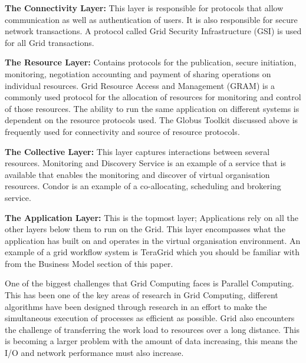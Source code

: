 \documentclass[10pt,journal,compsoc]{IEEEtran}
\begin{document}
\hspace{-0.5cm}\textbf{The Connectivity Layer:} This layer is responsible for protocols that allow communication as well as authentication of users. It is also responsible for secure network transactions. A protocol called Grid Security Infrastructure (GSI) is used for all Grid transactions. \cite{GridAndCloud} \newline

\hspace{-0.5cm}\textbf{The Resource Layer: } Contains protocols for the publication, secure initiation, monitoring, negotiation accounting and payment of sharing operations on individual resources. Grid Resource Access and Management (GRAM) is a commonly used protocol for the allocation of resources for monitoring and control of those resources. The ability to run the same application on different systems is dependent on the resource protocols used. The Globus Toolkit discussed above is frequently used for connectivity and source of resource protocols. \cite{global} \newline

\hspace{-0.5cm}\textbf{The Collective Layer:} This layer captures interactions between several resources. Monitoring and Discovery Service is an example of a service that is available that enables the monitoring and discover of virtual organisation resources. Condor is an example of a co-allocating, scheduling and brokering service.\newline

\hspace{-0.5cm}\textbf{The Application Layer:} This is the topmost layer; Applications rely on all the other layers below them to run on the Grid. This layer encompasses what the application has built on and operates in the virtual organisation environment. An example of  a grid workflow system is TeraGrid which you should be familiar with from the Business Model section of this paper.\newline \newline \newline

\hspace{-0.5cm}One of the biggest challenges that Grid Computing faces is Parallel Computing. This has been one of the key areas of research in Grid Computing, different algorithms have been designed through research in an effort to make the simultaneous execution of processes as efficient as possible. Grid also encounters the challenge of transferring the work load to resources over a long distance. This is becoming a larger problem with the amount of data increasing, this means the I/O and network performance must also increase.\newline
\end{document}
